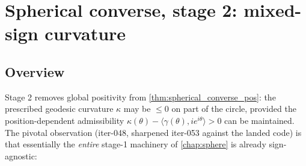 \chapter{Spherical converse, stage 2: mixed-sign curvature}
\label{chap:sphere_mixed}

%

\section{Overview}

Stage 2 removes global positivity from \cref{thm:spherical_converse_pos}: the
prescribed geodesic curvature $\kappa$ may be $\le0$ on part of the circle,
provided the position-dependent admissibility $\kappa(\theta)-\langle
\gamma(\theta),ie^{i\theta}\rangle>0$ can be maintained. The pivotal observation
(iter-048, sharpened iter-053 against the landed code) is that essentially the
\emph{entire} stage-1 machinery of \cref{chap:sphere} is already sign-agnostic:

